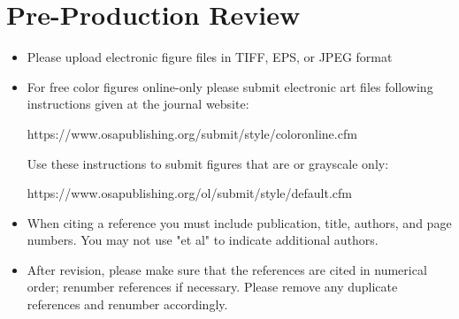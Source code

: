 \documentclass[]{article}
\begin{document}
\section{Pre-Production Review}
\begin{itemize}
\item Please upload electronic figure files in TIFF, EPS, or JPEG format

\item For free color figures online-only please submit electronic art files following instructions given at the journal website:

 https://www.osapublishing.org/submit/style/coloronline.cfm 
 
Use these instructions to submit figures that are or grayscale only:

 https://www.osapublishing.org/ol/submit/style/default.cfm

\item When citing a reference you must include publication, title, authors, and page numbers. You may not use "et al" to indicate additional authors.

\item After revision, please make sure that the references are cited in numerical order; renumber references if necessary. Please remove any duplicate references and renumber accordingly.
\end{itemize}
\end{document}
